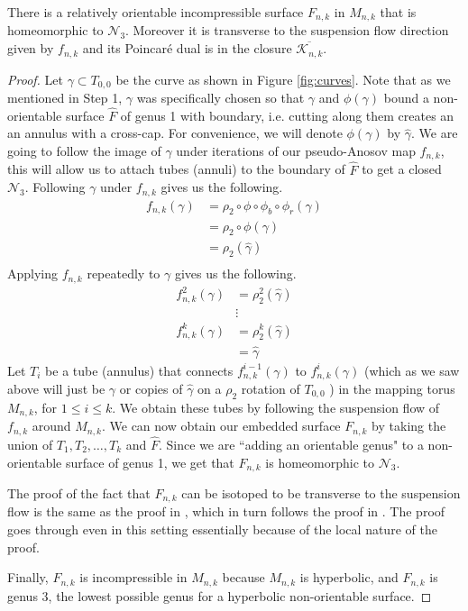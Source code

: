 \begin{lem}
\label{lem:genus3}
There is a relatively orientable incompressible surface $F_{n,k}$ in $M_{n,k}$ that is homeomorphic to $\mathcal{N}_3$.
Moreover it is transverse to the suspension flow direction given by $f_{n,k}$ and its Poincar\'e dual is in
the closure $\overline{\mathcal{K}_{n,k}}$.
\end{lem}
\begin{proof}
  Let $\gamma \subset T_{0,0}$ be the curve as shown in Figure \ref{fig:curves}. Note that as we mentioned in Step 1,
  $\gamma$ was specifically chosen so that $\gamma$ and $\phi(\gamma)$ bound a non-orientable surface
  $\hat{F}$ of genus 1 with boundary, i.e. cutting along them creates an an annulus with a cross-cap. For
  convenience, we will denote $\phi(\gamma)$ by $\hat{\gamma}$. We are going to follow the image of $\gamma$
  under iterations of our pseudo-Anosov map $f_{n,k}$, this will allow us to attach tubes (annuli) to the
  boundary of $\hat{F}$ to get a closed $\mathcal{N}_3$. Following $\gamma$ under $f_{n,k}$ gives us the
  following.
  \begin{align*}
    f_{n,k}(\gamma) &= \rho_2 \circ \phi \circ \phi_b \circ \phi_r(\gamma) \\
                    &= \rho_2 \circ \phi(\gamma) \\
                    &= \rho_2(\hat{\gamma}) \\
  \end{align*}
  Applying $f_{n,k}$ repeatedly to ${\gamma}$ gives us the following.
  \begin{align*}
    f^2_{n,k}(\gamma) &= \rho_2^2(\hat{\gamma}) \\
                      &\vdots \\
    f^k_{n,k}(\gamma) &= \rho_2^k(\hat{\gamma})\\
                      &= \hat{\gamma}
  \end{align*}
  Let $T_i$ be a tube (annulus) that connects $f_{n,k}^{i-1}(\gamma)$ to $f_{n,k}^i(\gamma)$
  (which as we saw above will just be $\gamma$ or copies of $\hat{\gamma}$ on a $\rho_2$ rotation of $T_{0,0}$
  ) in the mapping torus $M_{n,k}$, for $1 \leq i \leq k$. We obtain these tubes by following the suspension
  flow of $f_{n,k}$ around $M_{n,k}$. We can now obtain our embedded surface $F_{n,k}$ by taking the union of
  $T_1,T_2,\dots,T_k$ and $\hat{F}$. Since we are ``adding an orientable genus" to a non-orientable surface of
  genus 1, we get that $F_{n,k}$ is homeomorphic to $\mathcal{N}_3$.

  The proof of the fact that $F_{n,k}$ can be isotoped to be transverse to the suspension flow is the same as the
  proof in \cite{yazdi2018pseudo}, which in turn follows the proof in \cite{leininger2013number}. The proof goes
  through even in this setting essentially because of the local nature of the proof.

  Finally, $F_{n,k}$ is incompressible in $M_{n,k}$ because $M_{n,k}$ is hyperbolic, and $F_{n,k}$ is genus $3$, the
  lowest possible genus for a hyperbolic non-orientable surface.
\end{proof}


